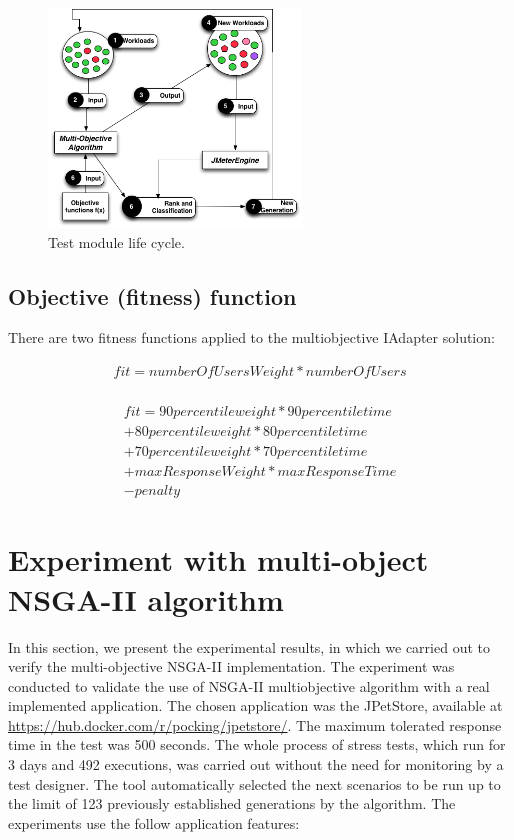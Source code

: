 \documentclass{report}
\begin{document}
\begin{figure}[!h]

\centering
\includegraphics[width=0.6\textwidth]{./images/step3.png}
\caption{Test module life cycle.}
\label{fig:step2}
\end{figure} 


\subsection{Objective (fitness) function}

There are two fitness functions applied to the multiobjective IAdapter solution:

\begin{equation}
\begin{aligned}
fit=numberOfUsersWeight*numberOfUsers\\
\end{aligned}
\end{equation}

\begin{equation}
\begin{aligned}
fit=90percentileweight* 90percentiletime\\
+80percentileweight*80percentiletime\\
+70percentileweight*70percentiletime\\
+maxResponseWeight*maxResponseTime\\
-penalty
\end{aligned}
\end{equation}


\section{Experiment with multi-object NSGA-II algorithm}

In this section,  we present the experimental results,  in which we carried out to verify the multi-objective NSGA-II   implementation. The experiment was conducted to validate the use of NSGA-II multiobjective algorithm with a real implemented application. The chosen application was the JPetStore, available at \url{https://hub.docker.com/r/pocking/jpetstore/}. The maximum tolerated response time in the test was 500 seconds.  The whole process of stress  tests, which run for 3 days and 492 executions, was carried out without the need for monitoring by a test designer. The tool automatically selected the next scenarios to be run up to the limit of 123 previously established  generations by the algorithm. The experiments use the follow application features:
\end{document}

